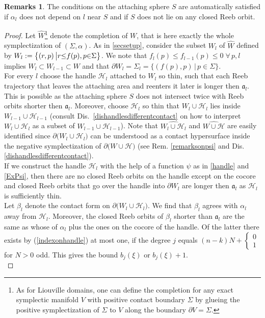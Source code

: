\documentclass[a4paper,12pt,bibliography=totocnumbered,titlepage=false,abstracton,bookmarksnumbered=true]{scrartcl}
\theoremstyle{definition}
\newtheorem*{rem}{Remarks}
\begin{document}
\begin{rem}
 The conditions on the attaching sphere $S$ are automatically satisfied if $\alpha_l$ does not depend on $l$ near $S$ and if $S$ does not lie on any closed Reeb orbit.
\end{rem}
\begin{proof}
 Let $\widehat{W}$\footnote{As for Liouville domains, one can define the completion for any exact symplectic manifold $V$ with positive contact boundary $\Sigma$ by glueing the positive symplectization of $\Sigma$ to $V$  along the boundary $\partial V=\Sigma$.} denote the completion of $W$, that is here exactly the whole symplectization of $(\Sigma,\alpha)$. As in \ref{secsetup}, consider the subset $W_l$ of $\widehat{W}$ defined by $W_l:=\big\{(r,p)\,\big| \linebreak r{\leq} f(p), p{\in}\Sigma\big\}$. We note that $f_l(p)\leq f_{l-1}(p)\leq 0\;\forall\,p,l$ implies $W_l\subset W_{l-1}\subset W$ and that $\partial W_l=\Sigma_l=\big\{(f(p),p)\,\big|\,p\in\Sigma\big\}$.\\
 For every $l$ choose the handle $\mathcal{H}_l$ attached to $W_l$ so thin, such that each Reeb trajectory that leaves the attaching area and reenters it later is longer then $\mathfrak{a}_l$. This is possible as the attaching sphere $S$ does not intersect twice with Reeb orbits shorter then $\mathfrak{a}_l$. Moreover, choose $\mathcal{H}_l$ so thin that $W_l{\cup}\mathcal{H}_l$ lies inside $W_{l-1}{\cup}\mathcal{H}_{l-1}$ (consult Dis.\ \ref{dishandlesdifferentcontact} on how to interpret $W_l{\cup}\mathcal{H}_l$ as a subset of $\widehat{W_{l-1}{\cup}\mathcal{H}_{l-1}}$). Note that $\widehat{W_l{\cup}\mathcal{H}_l}$ and $\widehat{W{\cup}\mathcal{H}}$ are easily identified since $\partial\big(W_l{\cup}\mathcal{H}_l\big)$ can be understood as a contact hypersurface inside the negative symplectization of $\partial\big(W{\cup}\mathcal{H}\big)$ (see Rem. \ref{remarksonpsi} and Dis. \ref{dishandlesdifferentcontact}).\\
 If we construct the handle $\mathcal{H}_l$ with the help of a function $\psi$ as in \ref{handle} and \ref{ExPsi}, then there are no closed Reeb orbits on the handle except on the cocore and closed Reeb orbits that go over the handle into $\partial W_l$ are longer then $\mathfrak{a}_l$ as $\mathcal{H}_l$ is sufficiently thin.\\
 Let $\beta_l$ denote the contact form on $\partial\big(W_l{\cup}\mathcal{H}_l\big)$. We find that $\beta_l$ agrees with $\alpha_l$ away from $\mathcal{H}_l$. Moreover, the closed Reeb orbits of $\beta_l$ shorter than $\mathfrak{a}_l$ are the same as whose of $\alpha_l$ plus the ones on the cocore of the handle. Of the latter there exists by (\ref{indexonhandle}) at most one, if the degree $j$ equals $(n{-}k)N+\left\lbrace\begin{smallmatrix}0\\1\end{smallmatrix}\right.$ for $N>0$ odd. This gives the bound $b_j(\xi)$ or $b_j(\xi)+1$.\\

\end{proof}
\end{document}

